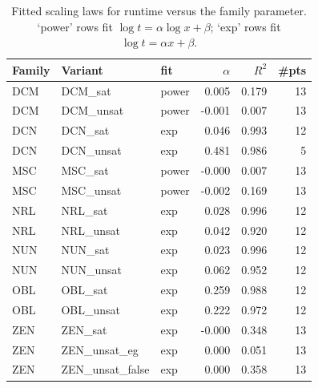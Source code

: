 \begin{table}[t]\centering
\caption{Fitted scaling laws for runtime versus the family parameter. `power' rows fit $\log t = \alpha\log x + \beta$; `exp' rows fit $\log t = \alpha x + \beta$.}
\label{tab:bench-scaling-laws}
\small
\begin{tabular}{lllrrr}
\toprule
Family & Variant & fit & $\alpha$ & $R^2$ & \#pts \\
\midrule
DCM & DCM\_sat & power & 0.005 & 0.179 & 13 \\
DCM & DCM\_unsat & power & -0.001 & 0.007 & 13 \\
DCN & DCN\_sat & exp & 0.046 & 0.993 & 12 \\
DCN & DCN\_unsat & exp & 0.481 & 0.986 & 5 \\
MSC & MSC\_sat & power & -0.000 & 0.007 & 13 \\
MSC & MSC\_unsat & power & -0.002 & 0.169 & 13 \\
NRL & NRL\_sat & exp & 0.028 & 0.996 & 12 \\
NRL & NRL\_unsat & exp & 0.042 & 0.920 & 12 \\
NUN & NUN\_sat & exp & 0.023 & 0.996 & 12 \\
NUN & NUN\_unsat & exp & 0.062 & 0.952 & 12 \\
OBL & OBL\_sat & exp & 0.259 & 0.988 & 12 \\
OBL & OBL\_unsat & exp & 0.222 & 0.972 & 12 \\
ZEN & ZEN\_sat & exp & -0.000 & 0.348 & 13 \\
ZEN & ZEN\_unsat\_eg & exp & 0.000 & 0.051 & 13 \\
ZEN & ZEN\_unsat\_false & exp & 0.000 & 0.358 & 13 \\
\bottomrule
\end{tabular}
\end{table}
